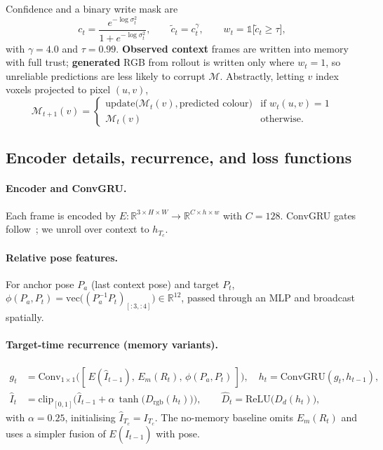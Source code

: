 \documentclass[11pt]{article}
\begin{document}
Confidence and a binary write mask are
\begin{equation}
c_t = \frac{e^{-\log\sigma_t^2}}{1 + e^{-\log\sigma_t^2}},
\qquad
\tilde c_t = c_t^{\gamma},
\qquad
w_t = \mathbb{1}\bigl[\tilde c_t \ge \tau\bigr],
\end{equation}
with $\gamma=4.0$ and $\tau=0.99$. \textbf{Observed context} frames are written into memory with full trust;
\textbf{generated} RGB from rollout is written only where $w_t{=}1$, so unreliable predictions are less
likely to corrupt $\mathcal{M}$. Abstractly, letting $v$ index voxels projected to pixel $(u,v)$,
\begin{equation}
\mathcal{M}_{t+1}(v) =
\begin{cases}
\mathrm{update}\bigl(\mathcal{M}_t(v), \text{predicted colour}\bigr) & \text{if } w_t(u,v)=1 \\
\mathcal{M}_t(v) & \text{otherwise.}
\end{cases}
\end{equation}

\subsection{Encoder details, recurrence, and loss functions}
\label{sec:method-loss}

\paragraph{Encoder and ConvGRU.}
Each frame is encoded by $E:\mathbb{R}^{3\times H\times W}\rightarrow\mathbb{R}^{C\times h\times w}$ with
$C{=}128$. ConvGRU gates follow~\cite{convgru}; we unroll over context to $h_{T_c}$.

\paragraph{Relative pose features.}
For anchor pose $P_a$ (last context pose) and target $P_t$,
$\phi(P_a,P_t) = \mathrm{vec}\bigl( (P_a^{-1} P_t)_{[:3,:4]} \bigr)\in\mathbb{R}^{12}$, passed through an
MLP and broadcast spatially.

\paragraph{Target-time recurrence (memory variants).}
\begin{align}
g_t &= \mathrm{Conv}_{1\times1}\bigl(
  [\,E(\hat I_{t-1}),\, E_m(R_t),\, \phi(P_a,P_t)\,]\bigr),
\quad
h_t = \mathrm{ConvGRU}(g_t, h_{t-1}), \\
\hat I_t &= \mathrm{clip}_{[0,1]}\bigl(
\hat I_{t-1} + \alpha\,\tanh\bigl(D_{\text{rgb}}(h_t)\bigr)\bigr),
\qquad
\hat D_t = \mathrm{ReLU}\bigl(D_d(h_t)\bigr),
\end{align}
with $\alpha=0.25$, initialising $\hat I_{T_c}=I_{T_c}$. The no-memory baseline omits $E_m(R_t)$ and uses a
simpler fusion of $E(\hat I_{t-1})$ with pose.
\end{document}
